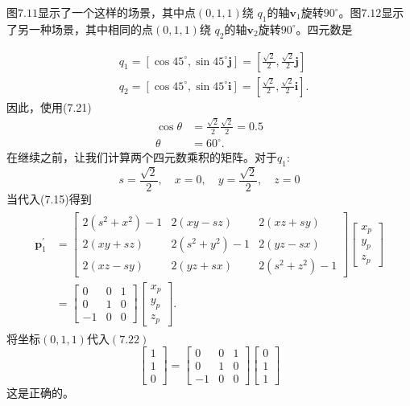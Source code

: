 图$7.11$显示了一个这样的场景，其中点$(0,1,1)$绕 $q_{1}$的轴$\mathbf{v}_{1}$旋转$90^{\circ}$。图$7.12$显示了另一种场景，其中相同的点$(0,1,1)$绕 $q_{2}$的轴$\mathbf{v}_{2}$旋转$90^{\circ}$。四元数是

$$
\begin{aligned}
& q_{1}=\left[\cos 45^{\circ}, \sin 45^{\circ} \mathbf{j}\right]=\left[\frac{\sqrt{2}}{2}, \frac{\sqrt{2}}{2} \mathbf{j}\right] \\
& q_{2}=\left[\cos 45^{\circ}, \sin 45^{\circ} \mathbf{i}\right]=\left[\frac{\sqrt{2}}{2}, \frac{\sqrt{2}}{2} \mathbf{i}\right] .
\end{aligned}
$$
因此，使用(7.21)
$$
\begin{aligned}
\cos \theta & =\frac{\sqrt{2}}{2} \frac{\sqrt{2}}{2}=0.5 \\
\theta & =60^{\circ} .
\end{aligned}
$$
在继续之前，让我们计算两个四元数乘积的矩阵。对于$q_{1}$:
$$
s=\frac{\sqrt{2}}{2}, \quad x=0, \quad y=\frac{\sqrt{2}}{2}, \quad z=0
$$
当代入(7.15)得到
\begin{align}
\begin{aligned}
\mathbf{p}_{1}^{\prime} & =\left[\begin{array}{ccc}
2\left(s^{2}+x^{2}\right)-1 & 2(x y-s z) & 2(x z+s y) \\
2(x y+s z) & 2\left(s^{2}+y^{2}\right)-1 & 2(y z-s x) \\
2(x z-s y) & 2(y z+s x) & 2\left(s^{2}+z^{2}\right)-1
\end{array}\right]\left[\begin{array}{l}
x_{p} \\
y_{p} \\
z_{p}
\end{array}\right] \\
& =\left[\begin{array}{ccc}
0 & 0 & 1 \\
0 & 1 & 0 \\
-1 & 0 & 0
\end{array}\right]\left[\begin{array}{l}
x_{p} \\
y_{p} \\
z_{p}
\end{array}\right] .
\end{aligned}
\end{align}
将坐标$(0,1,1)$代入$(7.22)$
$$
\left[\begin{array}{l}
1 \\
1 \\
0
\end{array}\right]=\left[\begin{array}{ccc}
0 & 0 & 1 \\
0 & 1 & 0 \\
-1 & 0 & 0
\end{array}\right]\left[\begin{array}{l}
0 \\
1 \\
1
\end{array}\right]
$$
这是正确的。

